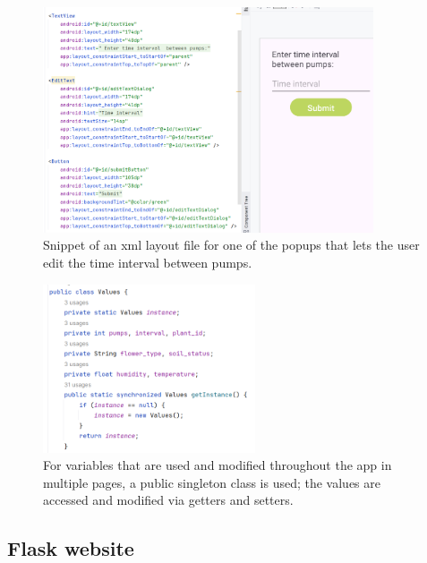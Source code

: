 \documentclass[12pt]{article}
\begin{document}
\newpage

\begin{figure}[ht]
    \centering
    \includegraphics[width=0.87\textwidth]{images/image1.png}
    \caption{Snippet of an xml layout file for one of the popups that lets the user edit the time interval between pumps.}
    \label{fig:pic3}
\end{figure} 


\begin{figure}[ht]
    \centering
    \includegraphics[width=0.56\textwidth]{images/image3.png}
    \caption{For variables that are used and modified throughout the app in multiple pages, a public singleton class is used; the values are accessed and modified via getters and setters.}
    \label{fig:pic2}
\end{figure} 


\newpage

\subsection{Flask website}
\end{document}
